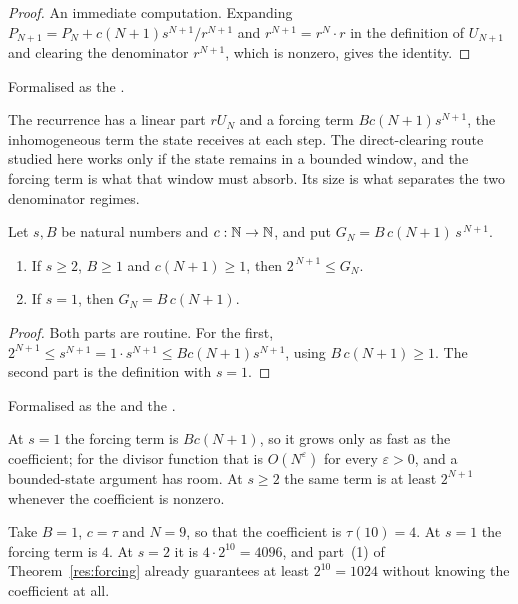 \documentclass[11pt]{article}
\begin{document}
\begin{proof}
An immediate computation.  Expanding
$P_{N+1}=P_N+c(N+1)s^{N+1}/r^{N+1}$ and $r^{N+1}=r^{N}\cdot r$ in the
definition of $U_{N+1}$ and clearing the denominator $r^{N+1}$, which is
nonzero, gives the identity.
\end{proof}

\noindent Formalised as the
.

The recurrence has a linear part $rU_N$ and a forcing term $Bc(N+1)s^{N+1}$,
the inhomogeneous term the state receives at each step.
The direct-clearing route studied here works only if the state remains in a
bounded window, and the forcing term is what that window must absorb.  Its
size is what separates the two denominator regimes.

\begin{theorem}\label{res:forcing}
Let $s,B$ be natural numbers and $c:\mathbb{N}\to\mathbb{N}$, and put
$G_N=B\,c(N+1)\,s^{\,N+1}$.
\begin{enumerate}
\item If $s\ge2$, $B\ge1$ and $c(N+1)\ge1$, then $2^{\,N+1}\le G_N$.
\item If $s=1$, then $G_N=B\,c(N+1)$.
\end{enumerate}
\end{theorem}

\begin{proof}
Both parts are routine.  For the first,
$2^{N+1}\le s^{N+1}=1\cdot s^{N+1}\le Bc(N+1)s^{N+1}$,
using $B\,c(N+1)\ge1$.  The second part is the definition with $s=1$.
\end{proof}

\noindent Formalised as the
 and the
.

At $s=1$ the forcing term is $Bc(N+1)$, so it grows only as fast as the
coefficient; for the divisor function that is $O(N^{\varepsilon})$ for every
$\varepsilon>0$, and a bounded-state argument has room.  At $s\ge2$ the same
term is at least $2^{N+1}$ whenever the coefficient is nonzero.

\begin{example}\label{ex:forcing}
Take $B=1$, $c=\tau$ and $N=9$, so that the coefficient is $\tau(10)=4$.  At
$s=1$ the forcing term is $4$.  At $s=2$ it is $4\cdot2^{10}=4096$, and part~(1)
of Theorem~\ref{res:forcing} already guarantees at least $2^{10}=1024$ without
knowing the coefficient at all.
\end{example}
\end{document}
